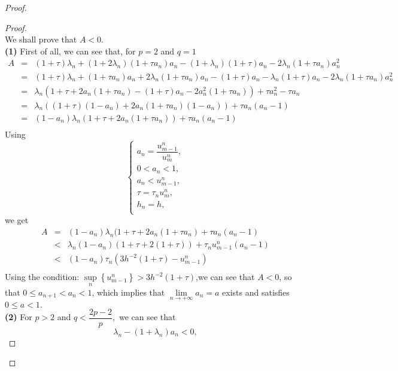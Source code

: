 \documentclass[a4paper,12pt,english,reqno]{smfart}
\begin{document}
\begin{proof}
\begin{proof}
\begin{equation*}
			\end{equation*}
			We shall prove that $A< 0.$\\
			\textbf{(1)} First of all, we can see that, for $p=2$ and $q=1$
			\begin{eqnarray*}
			A&=&(1+\tau)\lambda_{n}+(1+2\lambda_{n})(1+\tau a_{n})a_{n}-(1+\lambda_{n})(1+\tau)a_{n}-2\lambda_{n}(1+\tau a_{n})a_{n}^{2}\\
			&=& (1+\tau)\lambda_{n}+(1+\tau a_{n})a_{n}+2\lambda_{n}(1+\tau a_{n})a_{n}-(1+\tau)a_{n}-\lambda_{n}(1+\tau)a_{n}-2\lambda_{n}(1+\tau a_{n})a_{n}^{2}\\
			&=&\lambda_{n}\left(1+\tau+2a_{n}(1+\tau a_{n})-(1+\tau)a_{n}-2a_{n}^{2}(1+\tau a_{n}) \right)+\tau a_{n}^{2}-\tau a_{n}\\ 
			&=&\lambda_{n}\left((1+\tau)(1-a_{n})+2a_{n}(1+\tau a_{n})(1-a_{n}) \right)+\tau a_{n}(a_{n}-1)\\
		    &=&(1-a_{n})\lambda_{n}(1+\tau +2a_{n}(1+\tau a_{n}))+\tau a_{n}(a_{n}-1)\\
			\end{eqnarray*}
			Using
			\begin{equation*}
			\left\{
			\begin{array}{lll}
			a_{n}=\dfrac{u_{m-1}^{n}}{u_{m}^{n}},\\
			0<a_{n}<1,\\
			a_{n}<u_{m-1}^{n},\\
			\tau=\tau_{n}u_{m}^{n},\\
			h_{n}=h,\\
			\end{array}
			\right.
			\end{equation*}
			we get
			\begin{eqnarray*}
				A&=&(1-a_{n})\lambda_{n}(1+\tau +2a_{n}(1+\tau a_{n})+\tau a_{n}(a_{n}-1) \\
				& <& \lambda_{n}(1-a_{n})(1+\tau +2(1+\tau))+\tau_{n} u_{m-1}^{n}(a_{n}-1)\\
				& < &(1-a_{n})\tau_{n} (3h^{-2}(1+\tau)-u_{m-1}^{n})\\
			\end{eqnarray*}
			Using the condition: $\sup\limits_{n}\left\{u_{m-1}^{n}\right\}>3h^{-2}(1+\tau)$,we can see that $A< 0$, so that $0\leq a_{n+1}< a_{n}<1$, which implies that $\lim\limits_{n\rightarrow +\infty}a_{n}=a$ exists and satisfies $0\leq a<1.$\\
			\textbf{(2)} For $p>2$ and $q<\dfrac{2p-2}{p},$ we can see that
			\begin{equation*}
			\lambda_{n}-(1+\lambda_{n})a_{n}<0,

\end{equation*}
\end{proof}
\end{proof}
\end{document}
